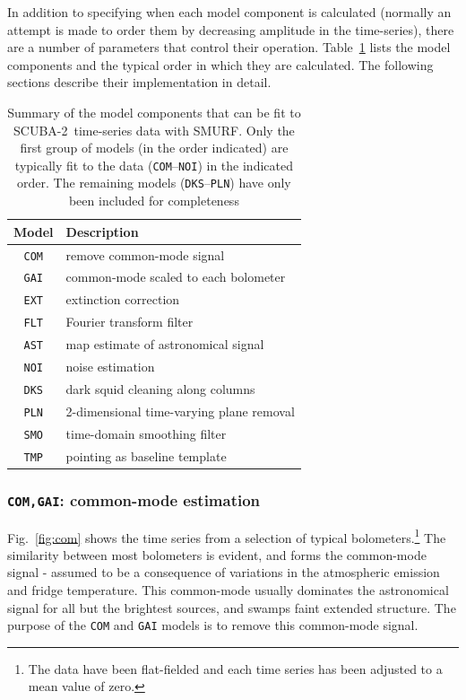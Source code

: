 \documentclass[useAMS,usenatbib,nofootinbib]{mn2e}
\newcommand{\scuba}{SCUBA-2}
\newcommand{\model}[1]{\texttt{#1}}
\begin{document}
In addition to specifying when each model component is calculated
(normally an attempt is made to order them by decreasing amplitude in
the time-series), there are a number of parameters that control their
operation. Table~\ref{tab:components} lists the model components and
the typical order in which they are calculated. The following sections
describe their implementation in detail.

\begin{table}
  \caption{Summary of the model components that can be fit to
    \scuba\ time-series data with SMURF. Only the first group of
    models (in the order indicated) are typically fit to the data
    (\model{COM}--\model{NOI}) in the indicated order. The remaining
    models (\model{DKS}--\model{PLN}) have only been included for
    completeness}
  \vspace{0.2cm}
  \centering
  \begin{tabular}{c|l}
    \hline
    Model & Description \\
    \hline
    \model{COM} & remove common-mode signal \\
    \model{GAI} & common-mode scaled to each bolometer \\
    \model{EXT} & extinction correction \\
    \model{FLT} & Fourier transform filter \\
    \model{AST} & map estimate of astronomical signal \\
    \model{NOI} & noise estimation \\
    \hline
    \model{DKS} & dark squid cleaning along columns \\
    \model{PLN} & 2-dimensional time-varying plane removal \\
    \model{SMO} & time-domain smoothing filter \\
    \model{TMP} & pointing as baseline template \\
    \hline
    \end{tabular}
  \label{tab:components}
\end{table}

\subsubsection{\model{COM,GAI}: common-mode estimation}
\label{sec:comgai}

﻿Fig.~\ref{fig:com} shows the time series from a selection of typical
bolometers.\footnote{The data have been flat-fielded and each time series
has been adjusted to a mean value of zero.} The similarity between most
bolometers is evident, and forms the common-mode signal - assumed to be a
consequence of variations in the atmospheric emission and fridge
temperature. This common-mode usually dominates the astronomical signal
for all but the brightest sources, and swamps faint extended structure.
The purpose of the \model{COM} and \model{GAI} models is to remove this common-mode
signal.
\end{document}
